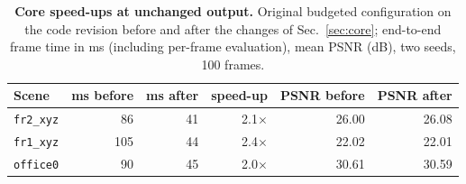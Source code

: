 \begin{table}[t]
\centering
\footnotesize\setlength{\tabcolsep}{3pt}
\begin{tabular}{lrrrrr}
\toprule
\textbf{Scene} & ms before & ms after & speed-up & PSNR before & PSNR after \\
\midrule
\texttt{fr2\_xyz} & 86 & 41 & 2.1$\times$ & 26.00 & 26.08 \\
\texttt{fr1\_xyz} & 105 & 44 & 2.4$\times$ & 22.02 & 22.01 \\
\texttt{office0} & 90 & 45 & 2.0$\times$ & 30.61 & 30.59 \\
\bottomrule
\end{tabular}
\caption{\textbf{Core speed-ups at unchanged output.} Original budgeted configuration on the code revision before and after the changes of Sec.~\ref{sec:core}; end-to-end frame time in ms (including per-frame evaluation), mean PSNR (dB), two seeds, 100 frames.}
\label{tab:enginespeed}
\end{table}
